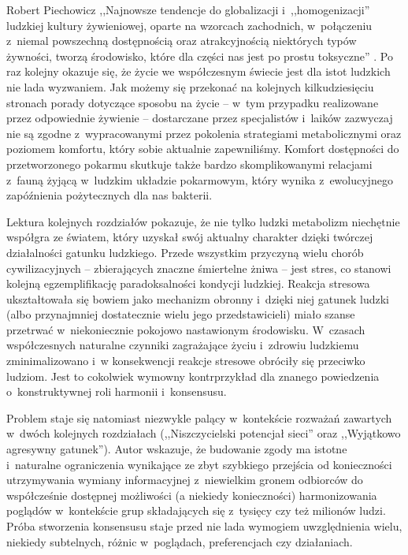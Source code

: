\begin{newrevplenv}{Robert Piechowicz}
,,Najnowsze tendencje do globalizacji i~,,homogenizacji'' ludzkiej kultury żywieniowej, oparte na wzorcach zachodnich, w~połączeniu z~niemal powszechną dostępnością oraz atrakcyjnością niektórych typów żywności, tworzą środowisko, które dla części nas jest po prostu toksyczne''
\parencite[][s.~108]{hart_niedostosowani_2021}. %
 Po raz kolejny okazuje się, że życie we współczesnym świecie jest dla istot ludzkich nie lada wyzwaniem. Jak możemy się przekonać na kolejnych kilkudziesięciu stronach porady dotyczące sposobu na życie -- w~tym przypadku realizowane przez odpowiednie żywienie -- dostarczane przez specjalistów i~laików zazwyczaj nie są zgodne z~wypracowanymi przez pokolenia strategiami metabolicznymi oraz poziomem komfortu, który sobie aktualnie zapewniliśmy. Komfort dostępności do przetworzonego pokarmu skutkuje także bardzo skomplikowanymi relacjami z~fauną żyjącą w~ludzkim układzie pokarmowym, który wynika z~ewolucyjnego zapóźnienia pożytecznych dla nas bakterii.

Lektura kolejnych rozdziałów pokazuje, że nie tylko ludzki metabolizm niechętnie współgra ze światem, który uzyskał swój aktualny charakter dzięki twórczej działalności gatunku ludzkiego. Przede wszystkim przyczyną wielu chorób cywilizacyjnych -- zbierających znaczne śmiertelne żniwa -- jest stres, co stanowi kolejną egzemplifikację paradoksalności kondycji ludzkiej. Reakcja stresowa ukształtowała się bowiem jako mechanizm obronny i~dzięki niej gatunek ludzki (albo przynajmniej dostatecznie wielu jego przedstawicieli) miało szanse przetrwać w~niekoniecznie pokojowo nastawionym środowisku. W~czasach współczesnych naturalne czynniki zagrażające życiu i~zdrowiu ludzkiemu zminimalizowano i~w konsekwencji reakcje stresowe obróciły się przeciwko ludziom. Jest to cokolwiek wymowny kontrprzykład dla znanego powiedzenia o~konstruktywnej roli harmonii i~konsensusu.

Problem staje się natomiast niezwykle palący w~kontekście rozważań zawartych w~dwóch kolejnych rozdziałach (,,Niszczycielski potencjał sieci'' oraz ,,Wyjątkowo agresywny gatunek''). Autor wskazuje, że budowanie zgody ma istotne i~naturalne ograniczenia wynikające ze zbyt szybkiego przejścia od konieczności utrzymywania wymiany informacyjnej z~niewielkim gronem odbiorców do współcześnie dostępnej możliwości (a niekiedy konieczności) harmonizowania poglądów w~kontekście grup składających się z~tysięcy czy też milionów ludzi. Próba stworzenia konsensusu staje przed nie lada wymogiem uwzględnienia wielu, niekiedy subtelnych, różnic w~poglądach, preferencjach czy działaniach.


\end{newrevplenv}
